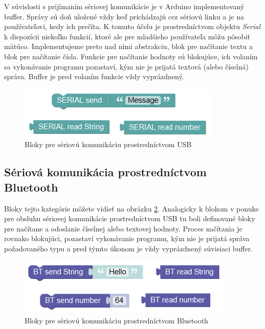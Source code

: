 V súvislosti s prijímaním sériovej komunikácie je v Arduino implementovaný buffer. Správy sú doň uložené vždy keď prichádzajú cez sériovú linku a je na používateľovi, kedy ich prečíta. K tomuto účelu je prostredníctvom objektu \textit{Serial} k dispozícii niekoľko funkcií, ktoré ale pre mladšieho používateľa môžu pôsobiť mätúco. Implementujeme preto nad nimi abstrakciu, blok pre načítanie textu a blok pre načítanie čísla. Funkcie pre načítanie hodnoty sú blokujúce, ich volaním sa vykonávanie programu pozastaví, kým nie je prijatá textová (alebo číselná) správa. Buffer je pred volaním funkcie vždy vyprázdnený.

\begin{figure}[h!]
\centerline{\includegraphics[]{images/serial-blocks}}
\caption[Bloky pre sériovú komunikáciu prostredníctvom USB]{Bloky pre sériovú komunikáciu prostredníctvom USB}
\label{obr:serial-blocks}
\end{figure}


\subsection{Sériová komunikácia prostredníctvom Bluetooth}
Bloky tejto kategórie môžete vidieť na obrázku \ref{obr:bluetooth-blocks}. Analogicky k blokom v ponuke pre obsluhu sériovej komunikácie prostredníctvom USB tu boli definované bloky pre načítane a odoslanie číselnej alebo textovej hodnoty. Proces načítania je rovnako blokujúci, pozastaví vykonávanie programu, kým nie je prijatá správa požadovaného typu a pred týmto úkonom je vždy vyprázdnený súvisiaci buffer.

\begin{figure}[bh!]
\centerline{\includegraphics[]{images/bluetooth-blocks}}
\caption[Bloky pre sériovú komunikáciu prostredníctvom Bluetooth]{Bloky pre sériovú komunikáciu prostredníctvom Bluetooth}
\label{obr:bluetooth-blocks}
\end{figure}



